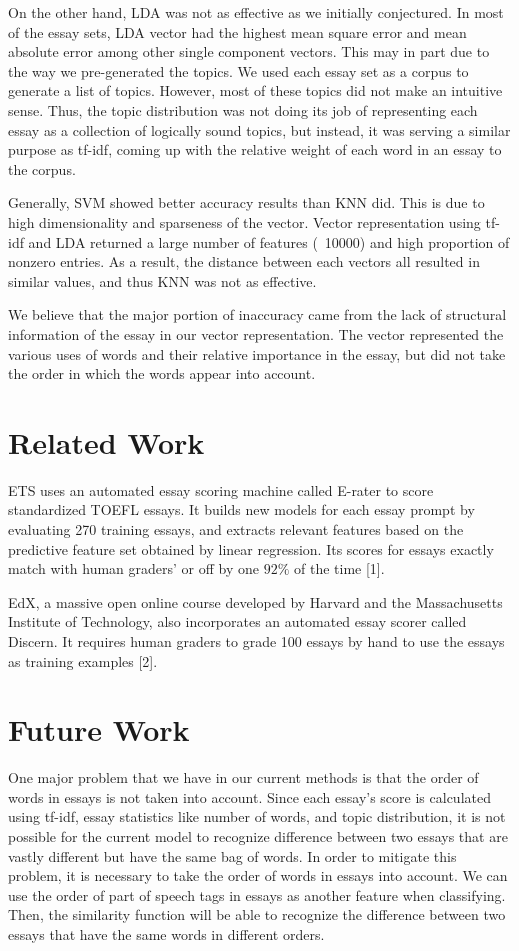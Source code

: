 \documentclass{article}
\begin{document}
On the other hand, LDA was not as effective as we initially conjectured. In most of the essay sets, LDA vector had the highest mean square error and mean absolute error among other single component vectors. This may in part due to the way we pre-generated the topics. We used each essay set as a corpus to generate a list of topics. However, most of these topics did not make an intuitive sense. Thus, the topic distribution was not doing its job of representing each essay as a collection of logically sound topics, but instead, it was serving a similar purpose as tf-idf, coming up with the relative weight of each word in an essay to the corpus.
 
Generally, SVM showed better accuracy results than KNN did. This is due to high dimensionality and sparseness of the vector. Vector representation using tf-idf and LDA returned a large number of features (~10000) and high proportion of nonzero entries. As a result, the distance between each vectors all resulted in similar values, and thus KNN was not as effective.
 
We believe that the major portion of inaccuracy came from the lack of structural information of the essay in our vector representation. The vector represented the various uses of words and their relative importance in the essay, but did not take the order in which the words appear into account.

\section{Related Work}
ETS uses an automated essay scoring machine called E-rater to score standardized TOEFL essays. It builds new models for each essay prompt by evaluating 270 training essays, and extracts relevant features based on the predictive feature set obtained by linear regression. Its scores for essays exactly match with human graders’ or off by one $92\%$ of the time [1].

EdX, a massive open online course developed by Harvard and the Massachusetts Institute of Technology, also incorporates an automated essay scorer called Discern. It requires human graders to grade 100 essays by hand to use the essays as training examples [2].

\section{Future Work}
One major problem that we have in our current methods is that the order of words in essays is not taken into account. Since each essay’s score is calculated using tf-idf, essay statistics like number of words, and topic distribution, it is not possible for the current model to recognize difference between two essays that are vastly different but have the same bag of words. In order to mitigate this problem, it is necessary to take the order of words in essays into account. We can use the order of part of speech tags in essays as another feature when classifying. Then, the similarity function will be able to recognize the difference between two essays that have the same words in different orders.
\end{document}
